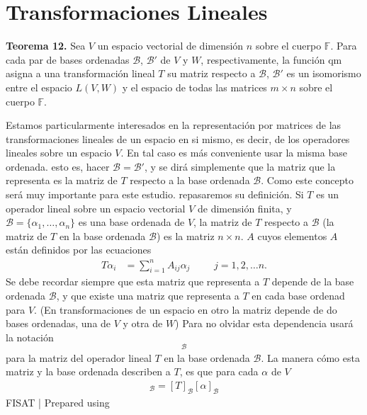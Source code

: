 \newpage
\section{{\Large Transformaciones Lineales}}
\textbf{Teorema 12.} Sea $V$ un espacio vectorial de dimensión $n$
sobre el cuerpo $\mathbb{F}$. Para cada par de bases ordenadas $\mathcal{B}$,
$\mathcal{B}'$ de $V$ y $W$, respectivamente, la función qm asigna a
una transformación lineal $T$ su matriz respecto a $\mathcal{B}$, 
$\mathcal{B}'$ es un isomorismo entre el espacio $L(V, W)$ y el espacio
de todas las matrices $m \times n$ sobre el cuerpo $\mathbb{F}$.

Estamos particularmente interesados en la representación por matrices de
las transformaciones lineales de un espacio en si mismo, es decir, de 
los operadores lineales sobre un espacio $V$. En tal caso es más conveniente
usar la misma base ordenada. esto es, hacer $\mathcal{B}=\mathcal{B}'$, y
se dirá simplemente que la matriz que la representa es la matriz de $T$
respecto a la base ordenada $\mathcal{B}$. Como este concepto será muy 
importante para este estudio. repasaremos su deﬁnición. Si $T$ es un 
operador lineal sobre un espacio vectorial $V$ de dimensión ﬁnita, y
$\mathcal{B}=\{\alpha_{1}, \dots, \alpha_{n}\}$ es una base ordenada de $V$, la matriz de $T$ respecto a 
$\mathcal{B}$ (la matriz de $T$ en la base ordenada $\mathcal{B}$) es la
matriz $n \times n$. $A$ cuyos elementos $A$ están deﬁnidos por las ecuaciones
\begin{align}
    T\alpha_{i}&=\sum_{i=1}^{n} A_{ij}\alpha_{j} &&& j=1,2, \dots n.
\end{align}
Se debe recordar siempre que esta matriz que representa a $T$ depende de
la base ordenada $\mathcal{B}$, y que existe una matriz que representa a $T$
en cada base ordenad para $V$. (En transformaciones de un espacio en
otro la matriz depende de do bases ordenadas, una de $V$ y otra de $W$)
Para no olvidar esta dependencia usará la notación
\begin{align*}
    [T]_\mathcal{B}
\end{align*}
para la matriz del operador lineal $T$ en la base ordenada $\mathcal{B}$.
La manera cómo esta matriz y la base ordenada describen a $T$, es que
para cada $\alpha$ de $V$
\begin{align*}
    [T\alpha]_\mathcal{B}=[T]_\mathcal{B}[\alpha]_\mathcal{B}
\end{align*}
\vfill
{\footnotesize{\textcopyright FISAT | Prepared using \LaTeXe}}

